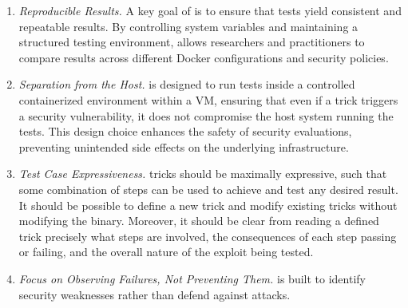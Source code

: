 \begin{enumerate}
  \item \label{dg:repro}\textit{Reproducible Results.} A key goal of \houdini is to ensure that tests yield consistent and repeatable results. By controlling system variables and maintaining a structured testing environment, \houdini allows researchers and practitioners to compare results across different Docker configurations and security policies.

  \item \label{dg:container}\textit{Separation from the Host.} \houdini is designed to run tests inside a controlled containerized environment within a VM, ensuring that even if a trick triggers a security vulnerability, it does not compromise the host system running the tests. This design choice enhances the safety of security evaluations, preventing unintended side effects on the underlying infrastructure.

  \item \label{dg:test}\textit{Test Case Expressiveness.} \houdini tricks should be maximally expressive, such that some combination of steps can be used to achieve and test any desired result. It should be possible to define a new \houdini trick and modify existing tricks without modifying the \houdini binary. Moreover, it should be clear from reading a defined trick precisely what steps are involved, the consequences of each step passing or failing, and the overall nature of the exploit being tested.

  \item \label{dg:failures}\textit{Focus on Observing Failures, Not Preventing Them.} \houdini is built to identify security weaknesses rather than defend against attacks.
\end{enumerate}
